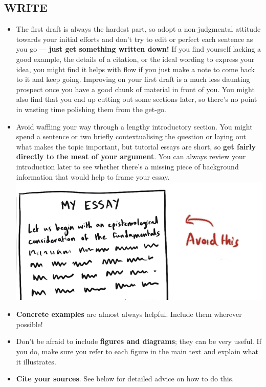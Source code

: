 \documentclass[10pt,a4paper]{article}
\begin{document}
\begin{multicols}{2}
\section*{WRITE}

\begin{itemize}
  \item The first draft is always the hardest part, so adopt a non-judgmental
attitude towards your initial efforts and don’t try to edit or perfect each
sentence as you go --- \textbf{just get something written down!} If you find
yourself lacking a good example, the details of a citation, or the ideal wording
to express your idea, you might find it helps with flow if you just make a note
to come back to it and keep going. Improving on your first draft is a much less
daunting prospect once you have a good chunk of material in front of you. You
might also find that you end up cutting out some sections later, so there’s no
point in wasting time polishing them from the get-go.
  \item Avoid waffling your way through a lengthy introductory section. You
might spend a sentence or two briefly contextualising the question or laying out
what makes the topic important, but tutorial essays are short, so \textbf{get
fairly directly to the meat of your argument}. You can always review your
introduction later to see whether there’s a missing piece of background
information that would help to frame your essay.
\hspace{0.2\columnwidth}
\includegraphics[width=0.8\columnwidth]{cartoons/how-not-to-introduction.png}
  \item \textbf{Concrete examples} are almost always helpful. Include them
wherever possible!
  \item Don’t be afraid to include \textbf{figures and diagrams}; they can be
very useful. If you do, make sure you refer to each figure in the main text and
explain what it illustrates.
  \item \textbf{Cite your sources}. See below for detailed advice on how to do
this.
\end{itemize}


\end{multicols}
\end{document}
